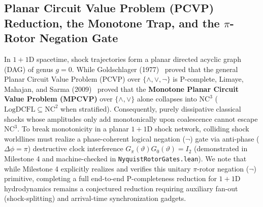 \documentclass[11pt,a4paper]{article}
\theoremstyle{definition}
\begin{document}
\subsection{Planar Circuit Value Problem (PCVP) Reduction, the Monotone Trap, and the $\pi$-Rotor Negation Gate}
\label{subsec:phase3-pcvp}
In $1+1\text{D}$ spacetime, shock trajectories form a planar directed acyclic graph (DAG) of genus $g = 0$. While Goldschlager (1977)~\cite{goldschlager1977} proved that the general Planar Circuit Value Problem (PCVP) over $\{\wedge, \vee, \neg\}$ is $\mathrm{P}$-complete, Limaye, Mahajan, and Sarma (2009)~\cite{limaye2009} proved that the \textbf{Monotone Planar Circuit Value Problem (MPCVP)} over $\{\wedge, \vee\}$ alone collapses into $\mathrm{NC}^3$ ($\mathrm{LogDCFL} \subseteq \mathrm{NC}^2$ when stratified). Consequently, purely dissipative classical shocks whose amplitudes only add monotonically upon coalescence cannot escape $\mathrm{NC}^3$.
To break monotonicity in a planar $1+1\text{D}$ shock network, colliding shock worldlines must realize a phase-coherent logical negation ($\neg$) gate via anti-phase ($\Delta\phi = \pi$) destructive clock interference $G_\pi(\vartheta)G_0(\vartheta) = I_2$ (demonstrated in Milestone 4 and machine-checked in \texttt{Nyquist\allowbreak{}Rotor\allowbreak{}Gates.lean}). We note that while Milestone 4 explicitly realizes and verifies this unitary $\pi$-rotor negation ($\neg$) primitive, completing a full end-to-end $\mathrm{P}$-completeness reduction for $1+1\text{D}$ hydrodynamics remains a conjectured reduction requiring auxiliary fan-out (shock-splitting) and arrival-time synchronization gadgets.
\end{document}
